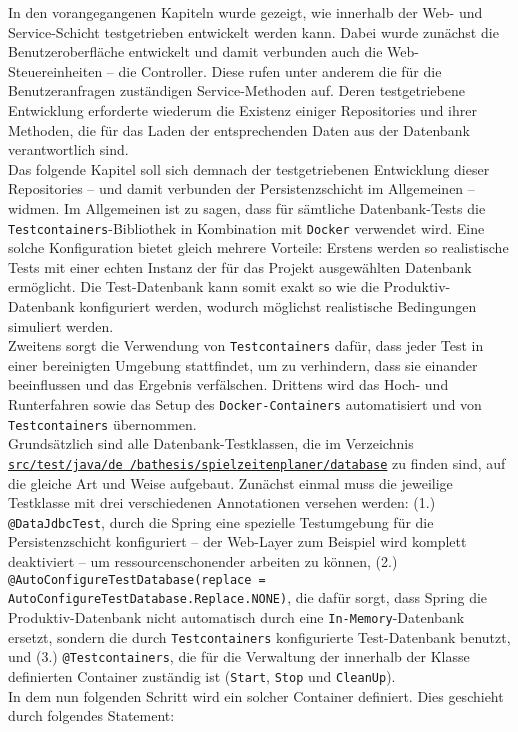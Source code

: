 
In den vorangegangenen Kapiteln wurde gezeigt, wie innerhalb der Web- und 
Service-Schicht testgetrieben entwickelt werden kann. Dabei wurde zunächst die 
Benutzeroberfläche entwickelt und damit verbunden auch die Web-Steuereinheiten -- 
die Controller. Diese rufen unter anderem die für die Benutzeranfragen zuständigen 
Service-Methoden auf. Deren testgetriebene Entwicklung erforderte wiederum die Existenz 
einiger Repositories und ihrer Methoden, die für das Laden der entsprechenden Daten aus 
der Datenbank verantwortlich sind. \\ 
Das folgende Kapitel soll sich demnach der testgetriebenen Entwicklung dieser 
Repositories -- und damit verbunden der Persistenzschicht im Allgemeinen -- widmen.
Im Allgemeinen ist zu sagen, dass für sämtliche Datenbank-Tests die 
\texttt{Testcontainers}-Bibliothek in Kombination mit \texttt{Docker} verwendet wird. 
Eine solche Konfiguration bietet gleich mehrere Vorteile: Erstens werden so 
realistische Tests mit einer echten Instanz der für das Projekt ausgewählten 
Datenbank ermöglicht. Die Test-Datenbank kann somit exakt so wie die 
Produktiv-Datenbank konfiguriert werden, wodurch möglichst realistische Bedingungen 
simuliert werden. \\ 
Zweitens sorgt die Verwendung von \texttt{Testcontainers} dafür, dass jeder Test in 
einer bereinigten Umgebung stattfindet, um zu verhindern, dass sie einander 
beeinflussen und das Ergebnis verfälschen. Drittens wird das Hoch- und Runterfahren 
sowie das Setup des \texttt{Docker-Containers} automatisiert und von 
\texttt{Testcontainers} übernommen. \\ 
Grundsätzlich sind alle Datenbank-Testklassen, die im Verzeichnis 
\href{https://github.com/FlorianOhmes/bat_spielzeitenplaner/tree/main/spielzeitenplaner/src/test/java/de/bathesis/spielzeitenplaner/database}{\texttt{src/test/java/de \linebreak /bathesis/spielzeitenplaner/database}}
zu finden sind, auf die gleiche Art und Weise aufgebaut. Zunächst einmal muss die 
jeweilige Testklasse mit drei verschiedenen Annotationen versehen werden: 
(1.) \texttt{@DataJdbcTest}, durch die Spring eine spezielle Testumgebung für die 
Persistenzschicht konfiguriert -- der Web-Layer zum Beispiel wird komplett deaktiviert 
-- um ressourcenschonender arbeiten zu können, (2.) 
\texttt{@AutoConfigureTestDatabase(replace = AutoConfigureTestDatabase.Replace.NONE)}, 
die dafür sorgt, dass Spring die Produktiv-Datenbank nicht automatisch durch eine 
\texttt{In-Memory}-Datenbank ersetzt, sondern die durch \texttt{Testcontainers} 
konfigurierte Test-Datenbank benutzt, und (3.) \texttt{@Testcontainers}, die für die 
Verwaltung der innerhalb der Klasse definierten Container zuständig ist 
(\texttt{Start}, \texttt{Stop} und \texttt{CleanUp}). \\ 
In dem nun folgenden Schritt wird ein solcher Container definiert. Dies geschieht 
durch folgendes Statement: 

